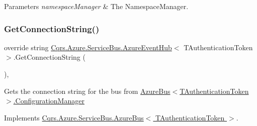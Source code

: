 \begin{DoxyParams}{Parameters}
{\em namespace\+Manager} & The Namespace\+Manager.\\
\hline
\end{DoxyParams}
\mbox{\label{classCqrs_1_1Azure_1_1ServiceBus_1_1AzureEventHub_a9855633b53ed1f67863ef9dffad0812c_a9855633b53ed1f67863ef9dffad0812c}} 
\subsubsection{\texorpdfstring{Get\+Connection\+String()}{GetConnectionString()}}
{\footnotesize\ttfamily override string \hyperlink{classCqrs_1_1Azure_1_1ServiceBus_1_1AzureEventHub}{Cqrs.\+Azure.\+Service\+Bus.\+Azure\+Event\+Hub}$<$ T\+Authentication\+Token $>$.Get\+Connection\+String (\begin{DoxyParamCaption}{ }\end{DoxyParamCaption})\hspace{0.3cm}{\ttfamily [protected]}, {\ttfamily [virtual]}}



Gets the connection string for the bus from \hyperlink{classCqrs_1_1Azure_1_1ServiceBus_1_1AzureBus_aaf9469d220fb23cb0521fa76b25ab228_aaf9469d220fb23cb0521fa76b25ab228}{Azure\+Bus$<$\+T\+Authentication\+Token$>$.\+Configuration\+Manager} 



Implements \hyperlink{classCqrs_1_1Azure_1_1ServiceBus_1_1AzureBus_a514e371d5ce093678365af31e6c274e3_a514e371d5ce093678365af31e6c274e3}{Cqrs.\+Azure.\+Service\+Bus.\+Azure\+Bus$<$ T\+Authentication\+Token $>$}.

\mbox{\label{classCqrs_1_1Azure_1_1ServiceBus_1_1AzureEventHub_a3747fb9fcb3de2a72c8a6d7bbd92db95_a3747fb9fcb3de2a72c8a6d7bbd92db95}} 
